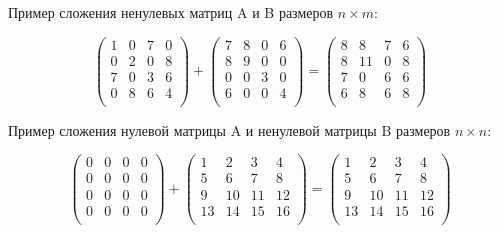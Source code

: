 \documentclass[12pt, a4paper]{article}
\begin{document}
Пример сложения ненулевых матриц A и B размеров $n \times m$: 

\[
\begin{pmatrix}
    1 & 0 & 7 & 0\\
    0 & 2 & 0 & 8\\ 
    7 & 0 & 3 & 6\\
    0 & 8 & 6 & 4\\
\end{pmatrix}
+
\begin{pmatrix}
    7 & 8 & 0 & 6\\
    8 & 9 & 0 & 0\\ 
    0 & 0 & 3 & 0\\
    6 & 0 & 0 & 4\\
\end{pmatrix}
=
\begin{pmatrix}
    8 & 8 & 7 & 6\\
    8 & 11 & 0 & 8\\ 
    7 & 0 & 6 & 6\\
    6 & 8 & 6 & 8\\
\end{pmatrix}
\]

Пример сложения нулевой матрицы A и ненулевой матрицы B размеров $n \times n$:

\[
\begin{pmatrix}
    0 & 0 & 0 & 0\\
    0 & 0 & 0 & 0\\ 
    0 & 0 & 0 & 0\\
    0 & 0 & 0 & 0\\
\end{pmatrix}
+
\begin{pmatrix}
    1 & 2 & 3 & 4\\
    5 & 6 & 7 & 8\\ 
    9 & 10 & 11 & 12\\
    13 & 14 & 15 & 16\\
\end{pmatrix}
=
\begin{pmatrix}
    1 & 2 & 3 & 4\\
    5 & 6 & 7 & 8\\ 
    9 & 10 & 11 & 12\\
    13 & 14 & 15 & 16\\
\end{pmatrix}
\]
\end{document}
